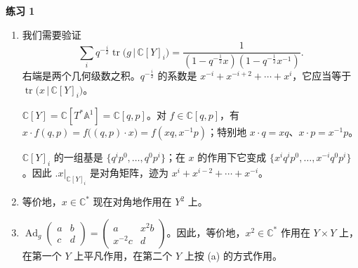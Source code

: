 \medskip
\noindent\textbf{练习 1}\enspace
\begin{enumerate}[label=(\alph*),leftmargin=2.0em,itemsep=0.35em,topsep=0.2em]
\item 我们需要验证
\[
\sum_i q^{-\frac i2}\operatorname{tr}\bigl(g\,\big|\,\mathbb C[Y]_i\bigr)=\frac{1}{(1-q^{-\frac12}x)(1-q^{-\frac12}x^{-1})}.
\]
右端是两个几何级数之积。$q^{-\frac i2}$ 的系数是 $x^{-i}+x^{-i+2}+\cdots+x^i$，它应当等于 $\operatorname{tr}\bigl(x\,\big|\,\mathbb C[Y]_i\bigr)$。

$\mathbb C[Y]=\mathbb C[T^*\mathbb A^1]=\mathbb C[q,p]$。对 $f\in\mathbb C[q,p]$，有 $x\cdot f(q,p)=f\bigl((q,p)\cdot x\bigr)=f(xq,x^{-1}p)$；特别地 $x\cdot q=xq$、$x\cdot p=x^{-1}p$。

$\mathbb C[Y]_i$ 的一组基是 $\{q^ip^0,\dots,q^0p^i\}$；在 $x$ 的作用下它变成 $\{x^iq^ip^0,\dots,x^{-i}q^0p^i\}$。因此 $\bigl.x\bigr|_{\mathbb C[Y]_i}$ 是对角矩阵，迹为 $x^i+x^{i-2}+\cdots+x^{-i}$。
\item 等价地，$x\in\mathbb C^*$ 现在对角地作用在 $Y^2$ 上。
\item $\operatorname{Ad}_g\begin{pmatrix}a&b\\c&d\end{pmatrix}=\begin{pmatrix}a&x^2b\\x^{-2}c&d\end{pmatrix}$。因此，等价地，$x^2\in\mathbb C^*$ 作用在 $Y\times Y$ 上，在第一个 $Y$ 上平凡作用，在第二个 $Y$ 上按 (a) 的方式作用。
\end{enumerate}
